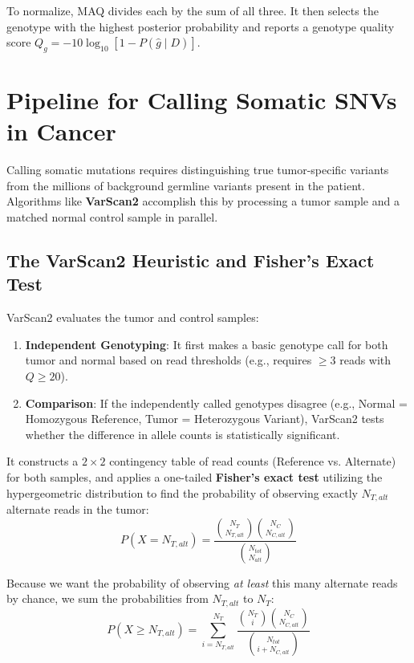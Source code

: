 To normalize, MAQ divides each by the sum of all three. It then selects the genotype with the highest posterior probability and reports a genotype quality score $Q_g = -10 \log_{10}[1 - P(\hat{g} \mid D)]$.

\section{Pipeline for Calling Somatic SNVs in Cancer}

Calling somatic mutations requires distinguishing true tumor-specific variants from the millions of background germline variants present in the patient. Algorithms like \textbf{VarScan2} accomplish this by processing a tumor sample and a matched normal control sample in parallel.

\subsection{The VarScan2 Heuristic and Fisher's Exact Test}
VarScan2 evaluates the tumor and control samples:
\begin{enumerate}
    \item \textbf{Independent Genotyping}: It first makes a basic genotype call for both tumor and normal based on read thresholds (e.g., requires $\ge 3$ reads with $Q \ge 20$).
    \item \textbf{Comparison}: If the independently called genotypes disagree (e.g., Normal = Homozygous Reference, Tumor = Heterozygous Variant), VarScan2 tests whether the difference in allele counts is statistically significant.
\end{enumerate}

It constructs a $2 \times 2$ contingency table of read counts (Reference vs. Alternate) for both samples, and applies a one-tailed \textbf{Fisher's exact test} utilizing the hypergeometric distribution to find the probability of observing exactly $N_{T,alt}$ alternate reads in the tumor:
\begin{equation}
    P(X = N_{T, alt}) = \frac{\binom{N_T}{N_{T, alt}} \binom{N_C}{N_{C, alt}}}{\binom{N_{tot}}{N_{alt}}}
\end{equation}

Because we want the probability of observing \textit{at least} this many alternate reads by chance, we sum the probabilities from $N_{T,alt}$ to $N_T$:
\begin{equation}
    P(X \ge N_{T, alt}) = \sum_{i=N_{T, alt}}^{N_T} \frac{\binom{N_T}{i} \binom{N_C}{N_{C, alt}}}{\binom{N_{tot}}{i + N_{C, alt}}}
\end{equation}

